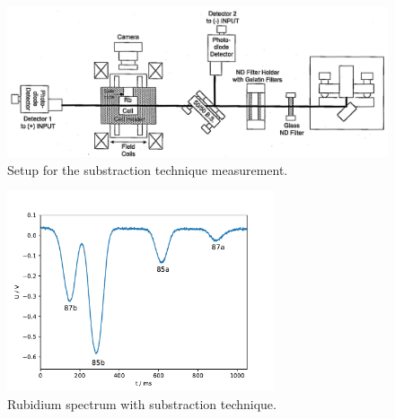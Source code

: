 \begin{figure}
  \centering
  \includegraphics[width=\textwidth]{Pics/setup_substraction.png}
  \caption{Setup for the substraction technique measurement.\cite{anleitung}}
  \label{fig:setup_substraction}
\end{figure}

\begin{figure}
  \centering
  \includegraphics[width=0.7\textwidth]{Pics/Rb_spectrum_subst.pdf}
  \caption{Rubidium spectrum with substraction technique.}
  \label{fig:spectrum_sub}
\end{figure}
